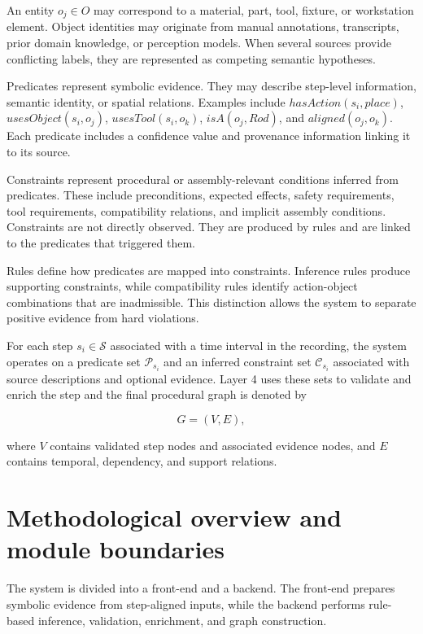 An entity $o_j \in O$ may correspond to a material, part, tool, fixture, or workstation element. Object identities may originate from manual annotations, transcripts, prior domain knowledge, or perception models. When several sources provide conflicting labels, they are represented as competing semantic hypotheses.

Predicates represent symbolic evidence. They may describe step-level information, semantic identity, or spatial relations. Examples include $hasAction(s_i,place)$, $usesObject(s_i,o_j)$, $usesTool(s_i,o_k)$, $isA(o_j,Rod)$, and $aligned(o_j,o_k)$. Each predicate includes a confidence value and provenance information linking it to its source.

Constraints represent procedural or assembly-relevant conditions inferred from predicates. These include preconditions, expected effects, safety requirements, tool requirements, compatibility relations, and implicit assembly conditions. Constraints are not directly observed. They are produced by rules and are linked to the predicates that triggered them.

Rules define how predicates are mapped into constraints. Inference rules produce supporting constraints, while compatibility rules identify action-object combinations that are inadmissible. This distinction allows the system to separate positive evidence from hard violations.

For each step $s_i \in \mathcal{S}$ associated with a time interval in the recording, the system operates on a predicate set $\mathcal{P}_{s_i}$ and an inferred constraint set $\mathcal{C}_{s_i}$ associated with source descriptions and optional evidence. Layer 4 uses these sets to validate and enrich the step and the final procedural graph is denoted by

\[
G = (V,E),
\]

where $V$ contains validated step nodes and associated evidence nodes, and $E$ contains temporal, dependency, and support relations.



\section{Methodological overview and module boundaries}
\label{sec:method-overview}

The system is divided into a front-end and a backend. The front-end prepares symbolic evidence from step-aligned inputs, while the backend performs rule-based inference, validation, enrichment, and graph construction.

